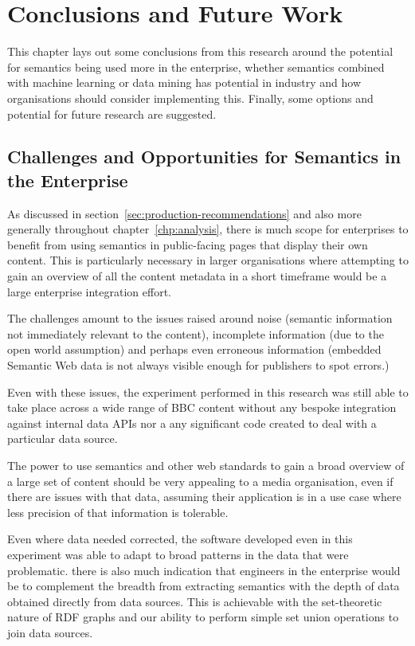 \chapter{Conclusions and Future Work}

This chapter lays out some conclusions from this research around the potential
for semantics being used more in the enterprise, whether semantics combined
with machine learning or data mining has potential in industry and how
organisations should consider implementing this. Finally, some options and
potential for future research are suggested.

\section{Challenges and Opportunities for Semantics in the Enterprise}

As discussed in section~\ref{sec:production-recommendations} and also more
generally throughout chapter~\ref{chp:analysis}, there is much scope for
enterprises to benefit from using semantics in public-facing pages that display
their own content. This is particularly necessary in larger organisations where
attempting to gain an overview of all the content metadata in a short timeframe
would be a large enterprise integration effort.

The challenges amount to the issues raised around noise (semantic information
not immediately relevant to the content), incomplete information (due to
the open world assumption) and perhaps even erroneous information (embedded
Semantic Web data is not always visible enough for publishers to spot errors.)

Even with these issues, the experiment performed in this research was still
able to take place across a wide range of BBC content without any bespoke
integration against internal data APIs nor a any significant code created
to deal with a particular data source.

The power to use semantics and other web standards to gain a broad overview
of a large set of content should be very appealing to a media organisation,
even if there are issues with that data, assuming their application is in
a use case where less precision of that information is tolerable.

Even where data needed corrected, the software developed even in this
experiment was able to adapt to broad patterns in the data that were
problematic. there is also much indication that engineers in the enterprise
would be to complement the breadth from extracting semantics with the depth
of data obtained directly from data sources. This is achievable with the
set-theoretic nature of RDF graphs and our ability to perform simple set
union operations to join data sources.

